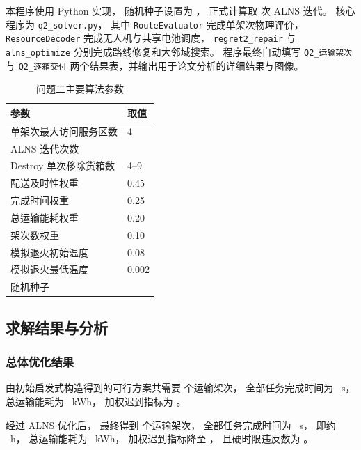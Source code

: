 本程序使用 Python 实现，
随机种子设置为 \QTwoSeed，
正式计算取 \QTwoIter 次 ALNS 迭代。
核心程序为 \texttt{q2\_solver.py}，
其中
\texttt{RouteEvaluator} 完成单架次物理评价，
\texttt{ResourceDecoder} 完成无人机与共享电池调度，
\texttt{regret2\_repair} 与 \texttt{alns\_optimize}
分别完成路线修复和大邻域搜索。
程序最终自动填写
\texttt{Q2\_运输架次} 与 \texttt{Q2\_逐箱交付}
两个结果表，并输出用于论文分析的详细结果与图像。

\begin{table}[htbp]
	\centering
	\caption{问题二主要算法参数}
	\label{tab:q2-parameters}
	\begin{tabularx}{0.86\linewidth}{Y Y}
		\toprule
		参数 & 取值 \\
		\midrule
		单架次最大访问服务区数 & 4 \\
		ALNS 迭代次数 & \QTwoIter \\
		Destroy 单次移除货箱数 & 4--9 \\
		配送及时性权重 & 0.45 \\
		完成时间权重 & 0.25 \\
		总运输能耗权重 & 0.20 \\
		架次数权重 & 0.10 \\
		模拟退火初始温度 & 0.08 \\
		模拟退火最低温度 & 0.002 \\
		随机种子 & \QTwoSeed \\
		\bottomrule
	\end{tabularx}
\end{table}
\FloatBarrier

\subsection{求解结果与分析}

\subsubsection{总体优化结果}

由初始启发式构造得到的可行方案共需要
\QTwoInitTrips 个运输架次，
全部任务完成时间为
\QTwoInitMakespan~s，
总运输能耗为
\QTwoInitEnergy~kWh，
加权迟到指标为
\QTwoInitLate。

经过 ALNS 优化后，
最终得到 \QTwoTrips 个运输架次，
全部任务完成时间为
\QTwoMakespan~s，
即约 \QTwoMakespanHour~h，
总运输能耗为
\QTwoEnergy~kWh，
加权迟到指标降至
\QTwoLate，
且硬时限违反数为
\QTwoHardViolation。

